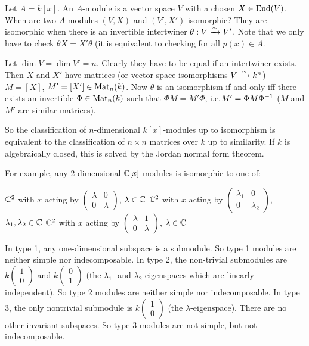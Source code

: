 \begin{exam}
	Let $A=k[x]$.
	An $A$-module is a vector space $V$ with a chosen $X \in \operatorname{End}(V)$.
	When are two $A$-modules $(V,X)$ and $(V',X')$ isomorphic?
	They are isomorphic when there is an invertible intertwiner $\theta:V \xrightarrow{\sim} V'$.
	Note that we only have to check $\theta X = X'\theta$ (it is equivalent to checking for all $p(x) \in A$.
	
	Let $\dim V = \dim V' = n$.
	Clearly they have to be equal if an intertwiner exists.
	Then $X$ and $X'$ have matrices (or vector space isomorphisms $V \xrightarrow{\sim} k^n$) $M = [X]$, $M'=[X'] \in \operatorname{Mat}_n(k)$.
	Now $\theta$ is an isomorphism if and only iff there exists an invertible $\Phi \in \operatorname{Mat}_n(k)$ such that $\Phi M = M'\Phi$, i.e.\@ $M' = \Phi M \Phi^{-1}$ ($M$ and $M'$ are similar matrices).
	
	So the classification of $n$-dimensional $k[x]$-modules up to isomorphism is equivalent to the classification of $n \times n$ matrices over $k$ up to similarity.
	If $k$ is algebraically closed, this is solved by the Jordan normal form theorem.
	
	For example, any 2-dimensional $\mathbb{C}[x]$-modules is isomorphic to one of:
	\begin{enum}
		\io $\mathbb{C}^2$ with $x$ acting by $
		\left(
		\begin{smallmatrix}
			\lambda & 0 \\
			0 & \lambda
		\end{smallmatrix}
		\right)
		$, $\lambda \in \mathbb{C}$
		\io $\mathbb{C}^2$ with $x$ acting by $
		\left(
		\begin{smallmatrix}
		\lambda_1 & 0 \\
		0 & \lambda_2
		\end{smallmatrix}
		\right)
		$, $\lambda_1,\lambda_2 \in \mathbb{C}$
		\io $\mathbb{C}^2$ with $x$ acting by $
		\left(
		\begin{smallmatrix}
		\lambda & 1 \\
		0 & \lambda
		\end{smallmatrix}
		\right)
		$, $\lambda \in \mathbb{C}$
	\end{enum}
	In type 1, any one-dimensional subspace is a submodule.
	So type 1 modules are neither simple nor indecomposable.
	In type 2, the non-trivial submodules are $k
	\left(
	\begin{smallmatrix}
	1 \\
	0
	\end{smallmatrix}
	\right)
	$
	and
	$k
	\left(
	\begin{smallmatrix}
	0 \\
	1
	\end{smallmatrix}
	\right)
	$ (the $\lambda_1$- and $\lambda_2$-eigenspaces which are linearly independent).
	So type 2 modules are neither simple nor indecomposable.
	In type 3, the only nontrivial submodule is
	$k
	\left(
	\begin{smallmatrix}
	1 \\
	0
	\end{smallmatrix}
	\right)
	$
	(the $\lambda$-eigenspace).
	There are no other invariant subspaces.
	So type 3 modules are not simple, but not indecomposable.
\end{exam}
